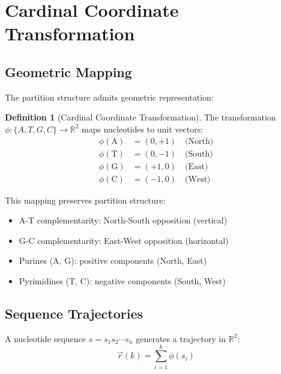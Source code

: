 \documentclass[twocolumn,10pt,a4paper]{article}
\theoremstyle{definition}
\newtheorem{definition}[theorem]{Definition}
\theoremstyle{remark}
\begin{document}
\section{Cardinal Coordinate Transformation}
\label{sec:cardinal}

\subsection{Geometric Mapping}

The partition structure admits geometric representation:

\begin{definition}[Cardinal Coordinate Transformation]
\label{def:cardinal}
The transformation $\phi: \{A, T, G, C\} \to \mathbb{R}^2$ maps nucleotides to unit vectors:
\begin{align}
    \phi(\text{A}) &= (0, +1) \quad \text{(North)} \\
    \phi(\text{T}) &= (0, -1) \quad \text{(South)} \\
    \phi(\text{G}) &= (+1, 0) \quad \text{(East)} \\
    \phi(\text{C}) &= (-1, 0) \quad \text{(West)}
\end{align}
\end{definition}

This mapping preserves partition structure:
\begin{itemize}
    \item A-T complementarity: North-South opposition (vertical)
    \item G-C complementarity: East-West opposition (horizontal)
    \item Purines (A, G): positive components (North, East)
    \item Pyrimidines (T, C): negative components (South, West)
\end{itemize}

\subsection{Sequence Trajectories}

A nucleotide sequence $s = s_1 s_2 \cdots s_n$ generates a trajectory in $\mathbb{R}^2$:
\begin{equation}
    \vec{r}(k) = \sum_{i=1}^{k} \phi(s_i)
\end{equation}
\end{document}
